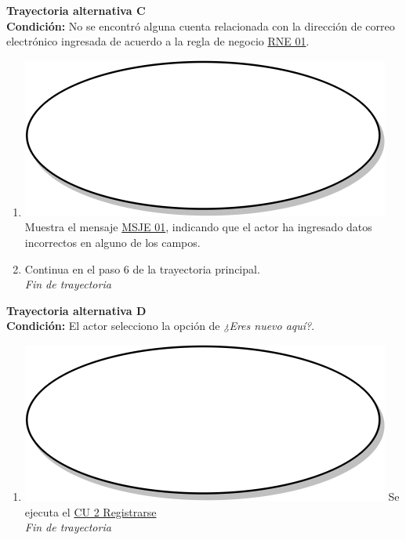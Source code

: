 \textbf{Trayectoria alternativa C} \label{cu1_1_ta_c}\\
\textbf{Condición:} No se encontró alguna cuenta relacionada con la dirección de correo electrónico ingresada de acuerdo a la regla de negocio \hyperref[rne_01]{RNE 01}.\\
 \begin{enumerate}[label=C\arabic*]
    \item {\includegraphics[scale=.05]{Capitulo3/img/proceso.png} Muestra el mensaje \hyperref[msje_01]{MSJE 01}, indicando que el actor ha ingresado datos incorrectos en alguno de los campos.}
    \item {Continua en el paso 6 de la trayectoria principal.} \\
    \textit{Fin de trayectoria} \\
\end{enumerate}

\textbf{Trayectoria alternativa D} \label{cu1_1_ta_d}\\
\textbf{Condición:} El actor selecciono la opción de \textit{¿Eres nuevo aquí?}.\\
 \begin{enumerate}[label=D\arabic*]
    \item {\includegraphics[scale=.05]{Capitulo3/img/proceso.png} Se ejecuta el \hyperref[cu2]{CU 2 Registrarse}} \\
    \textit{Fin de trayectoria} \\
\end{enumerate}

